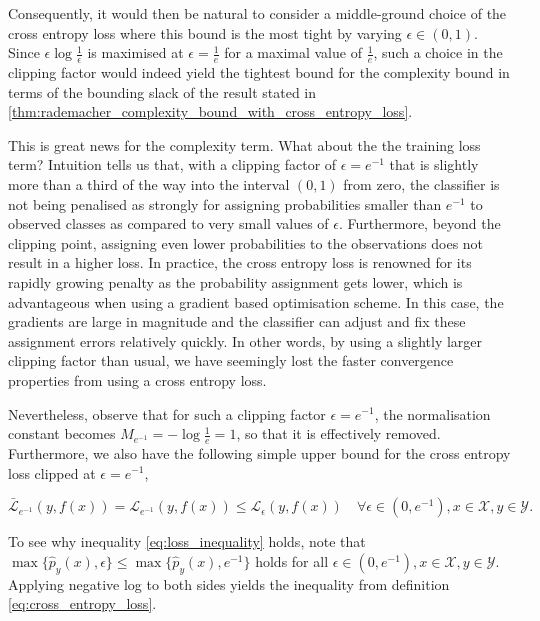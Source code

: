 \documentclass{article}
\begin{document}
		Consequently, it would then be natural to consider a middle-ground choice of the cross entropy loss where this bound is the most tight by varying $\epsilon \in (0, 1)$. Since $\epsilon \log{\frac{1}{\epsilon}}$ is maximised at $\epsilon = \frac{1}{e}$ for a maximal value of $\frac{1}{e}$, such a choice in the clipping factor would indeed yield the tightest bound for the complexity bound in terms of the bounding slack of the result stated in \cref{thm:rademacher_complexity_bound_with_cross_entropy_loss}.
		 
		This is great news for the complexity term. What about the the training loss term? Intuition tells us that, with a clipping factor of $\epsilon = e^{-1}$ that is slightly more than a third of the way into the interval $(0, 1)$ from zero, the classifier is not being penalised as strongly for assigning probabilities smaller than $e^{-1}$ to observed classes as compared to very small values of $\epsilon$. Furthermore, beyond the clipping point, assigning even lower probabilities to the observations does not result in a higher loss. In practice, the cross entropy loss is renowned for its rapidly growing penalty as the probability assignment gets lower, which is advantageous when using a gradient based optimisation scheme. In this case, the gradients are large in magnitude and the classifier can adjust and fix these assignment errors relatively quickly. In other words, by using a slightly larger clipping factor than usual, we have seemingly lost the faster convergence properties from using a cross entropy loss.
		
		Nevertheless, observe that for such a clipping factor $\epsilon = e^{-1}$, the normalisation constant becomes $M_{e^{-1}} = - \log{\frac{1}{e}} = 1$, so that it is effectively removed. Furthermore, we also have the following simple upper bound for the cross entropy loss clipped at $\epsilon = e^{-1}$,
		
		\begin{equation}
			\bar{\mathcal{L}}_{e^{-1}}(y, f(x)) = \mathcal{L}_{e^{-1}}(y, f(x)) \leq \mathcal{L}_{\epsilon}(y, f(x)) \quad \forall \epsilon \in (0, e^{-1}), x \in \mathcal{X}, y \in \mathcal{Y}.
		\label{eq:loss_inequality}
		\end{equation}
		
		
		To see why inequality \eqref{eq:loss_inequality} holds, note that $\max \{ \hat{p}_{y}(x), \epsilon \} \leq \max \{ \hat{p}_{y}(x), e^{-1} \}$ holds for all $\epsilon \in (0, e^{-1}), x \in \mathcal{X}, y \in \mathcal{Y}$. Applying negative log to both sides yields the inequality from definition \eqref{eq:cross_entropy_loss}.
\end{document}

